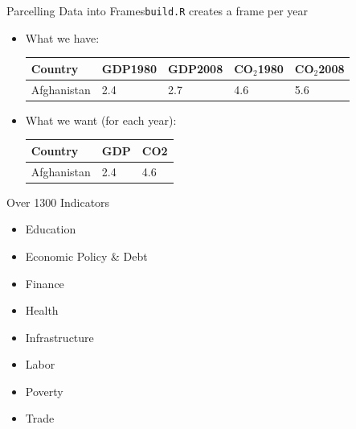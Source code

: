 \documentclass{beamer}
\begin{document}
\begin{frame}{Parcelling Data into Frames}{{\tt build.R} creates a frame per year}
  \begin{itemize}
  \item What we have: \\
    \begin{table}
      \begin{tabular}{| l || l | l | l | l |} \hline
	Country		& GDP1980	& GDP2008	& CO$_2$1980	& CO$_2$2008 \\ \hline
	Afghanistan	& 2.4			& 2.7			& 4.6				& 5.6 \\ \hline
      \end{tabular}
    \end{table}
    
  \item What we want (for each year): \\
    \begin{table}
      \begin{tabular}{ | l || l | l | } \hline
	Country     & GDP & CO2 \\ \hline
	Afghanistan & 2.4 & 4.6 \\ \hline
      \end{tabular}
    \end{table}
  \end{itemize}
\end{frame}

\begin{frame}{Over 1300 Indicators}
  \begin{itemize}
  \item Education
  \item Economic Policy \& Debt
  \item Finance
  \item Health
  \item Infrastructure
  \item Labor
  \item Poverty
  \item Trade
  \end{itemize}
\end{frame}



\end{document}

